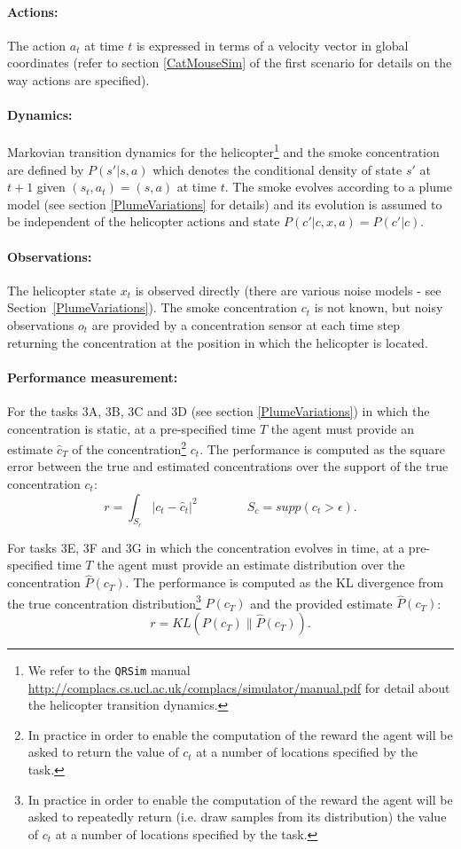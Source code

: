 \documentclass{article}
\newcommand{\webman}{\url{http://complacs.cs.ucl.ac.uk/complacs/simulator/manual.pdf}\xspace}
\begin{document}
\paragraph{Actions:}
The action $a_t$ at time $t$ is expressed in terms of a velocity vector in global coordinates (refer to section \ref{CatMouseSim} of the first scenario for details on the way actions are specified).

\paragraph{Dynamics:} Markovian transition dynamics for the helicopter\footnote{We refer to the \texttt{QRSim} manual \webman for detail about the helicopter transition dynamics.} and the smoke concentration are defined by $P(s'|s,a)$ which denotes the conditional density of state $s'$ at $t+1$ given $(s_t,a_t) = (s,a)$ at time $t$. The smoke evolves according to a plume model (see section \ref{PlumeVariations} for details) and its evolution is assumed to be independent of the helicopter actions and state  $P(c'|c,x,a)=P(c'|c)$.

\paragraph{Observations:} The helicopter state $x_t$ is observed directly (there are various noise models - see Section~\ref{PlumeVariations}). The smoke concentration $c_t$ is not known, but noisy observations $o_t$ are provided by a concentration sensor at each time step returning the concentration at the position in which the helicopter is located.

\paragraph{Performance measurement:} 
For the tasks 3A, 3B, 3C and 3D (see section \ref{PlumeVariations}) in which the concentration is static, at a pre-specified time $T$ the agent must provide an estimate $\hat c_T$ of the concentration\footnote{In practice in order to enable the computation of the reward the agent will be asked to return the value of $c_t$ at a number of locations specified by the task.} $c_t$.
The performance is computed as the square error between the true and estimated concentrations over the support of the true concentration $c_t$:
$$
r = \int_{S_c} | c_t - \hat{c}_t |^2  \qquad\qquad S_c=supp(c_t>\epsilon).
$$

For tasks 3E, 3F and 3G in which the concentration evolves in time, at a pre-specified time $T$ the agent must provide an estimate distribution over the concentration $\hat P(c_T)$.
The performance is computed as the KL divergence from the true concentration distribution\footnote{In practice in order to enable the computation of the reward the agent will be asked to repeatedly return (i.e. draw samples from its distribution) the value of $c_t$ at a number of locations specified by the task.} $P(c_T)$ and the provided estimate $\hat P(c_T)$:
$$
r = KL(P(c_T) \|\hat{P}(c_T)).
$$
\end{document}
